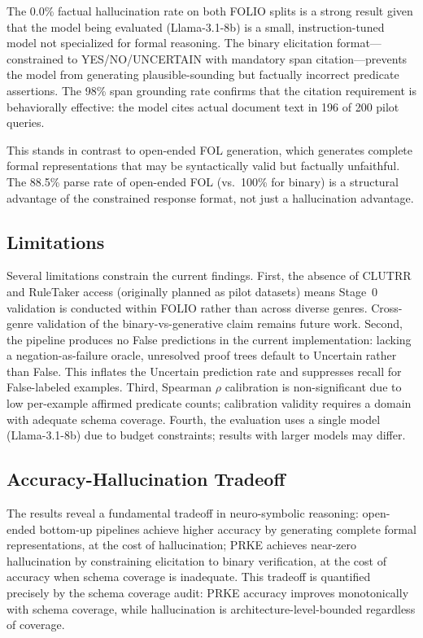 \documentclass[11pt,letterpaper]{article}
\begin{document}
The 0.0\% factual hallucination rate on both FOLIO splits is a strong result given that the model being evaluated (Llama-3.1-8b) is a small, instruction-tuned model not specialized for formal reasoning. The binary elicitation format---constrained to YES/NO/UNCERTAIN with mandatory span citation---prevents the model from generating plausible-sounding but factually incorrect predicate assertions. The 98\% span grounding rate confirms that the citation requirement is behaviorally effective: the model cites actual document text in 196 of 200 pilot queries.

This stands in contrast to open-ended FOL generation, which generates complete formal representations that may be syntactically valid but factually unfaithful. The 88.5\% parse rate of open-ended FOL (vs.\ 100\% for binary) is a structural advantage of the constrained response format, not just a hallucination advantage.

\subsection{Limitations}

Several limitations constrain the current findings. First, the absence of CLUTRR and RuleTaker access (originally planned as pilot datasets) means Stage~0 validation is conducted within FOLIO rather than across diverse genres. Cross-genre validation of the binary-vs-generative claim remains future work. Second, the pipeline produces no False predictions in the current implementation: lacking a negation-as-failure oracle, unresolved proof trees default to Uncertain rather than False. This inflates the Uncertain prediction rate and suppresses recall for False-labeled examples. Third, Spearman $\rho$ calibration is non-significant due to low per-example affirmed predicate counts; calibration validity requires a domain with adequate schema coverage. Fourth, the evaluation uses a single model (Llama-3.1-8b) due to budget constraints; results with larger models may differ.

\subsection{Accuracy-Hallucination Tradeoff}

The results reveal a fundamental tradeoff in neuro-symbolic reasoning: open-ended bottom-up pipelines achieve higher accuracy by generating complete formal representations, at the cost of hallucination; PRKE achieves near-zero hallucination by constraining elicitation to binary verification, at the cost of accuracy when schema coverage is inadequate. This tradeoff is quantified precisely by the schema coverage audit: PRKE accuracy improves monotonically with schema coverage, while hallucination is architecture-level-bounded regardless of coverage.
\end{document}
